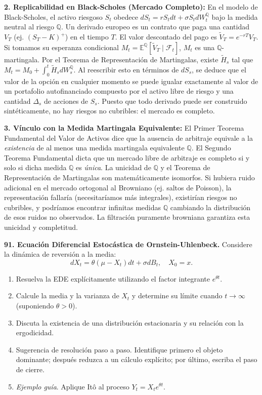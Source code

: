\documentclass[11pt, letterpaper]{article}
\begin{document}
\begin{solucion}
    \textbf{2. Replicabilidad en Black-Scholes (Mercado Completo):}
    En el modelo de Black-Scholes, el activo riesgoso $S_t$ obedece $dS_t = r S_t dt + \sigma S_t dW_t^\mathbb{Q}$ bajo la medida neutral al riesgo $\mathbb{Q}$. 
    Un derivado europeo es un contrato que paga una cantidad $V_T$ (ej. $(S_T - K)^+$) en el tiempo $T$. 
    El valor descontado del pago es $\tilde{V}_T = e^{-rT} V_T$. Si tomamos su esperanza condicional $M_t = \mathbb{E}^\mathbb{Q}[\tilde{V}_T \mid \mathcal{F}_t]$, $M_t$ es una $\mathbb{Q}$-martingala.
    Por el Teorema de Representación de Martingalas, existe $\tilde{H}_s$ tal que $M_t = M_0 + \int_0^t \tilde{H}_s dW_s^\mathbb{Q}$.
    Al reescribir esto en términos de $dS_s$, se deduce que el valor de la opción en cualquier momento se puede igualar exactamente al valor de un portafolio autofinanciado compuesto por el activo libre de riesgo y una cantidad $\Delta_s$ de acciones de $S_s$. Puesto que todo derivado puede ser construido sintéticamente, no hay riesgos no cubribles: el mercado es completo.

    \textbf{3. Vínculo con la Medida Martingala Equivalente:}
    El Primer Teorema Fundamental del Valor de Activos dice que la ausencia de arbitraje equivale a la \textit{existencia} de al menos una medida martingala equivalente $\mathbb{Q}$.
    El Segundo Teorema Fundamental dicta que un mercado libre de arbitraje es completo si y solo si dicha medida $\mathbb{Q}$ es \textit{única}.
    La unicidad de $\mathbb{Q}$ y el Teorema de Representación de Martingalas son matemáticamente isomorfos. Si hubiera ruido adicional en el mercado ortogonal al Browniano (ej. saltos de Poisson), la representación fallaría (necesitaríamos más integrales), existirían riesgos no cubribles, y podríamos encontrar infinitas medidas $\mathbb{Q}$ cambiando la distribución de esos ruidos no observados. La filtración puramente browniana garantiza esta unicidad y completitud.
\end{solucion}

\newpage

\begin{ejercicio}
    \textbf{91. Ecuación Diferencial Estocástica de Ornstein-Uhlenbeck.} Considere la dinámica de reversión a la media:
    \[ dX_t = \theta (\mu - X_t) dt + \sigma dB_t, \quad X_0 = x. \]
    \begin{enumerate}
        \item Resuelva la EDE explícitamente utilizando el factor integrante $e^{\theta t}$.
        \item Calcule la media y la varianza de $X_t$ y determine su límite cuando $t \to \infty$ (suponiendo $\theta > 0$).
        \item Discuta la existencia de una distribución estacionaria y su relación con la ergodicidad.
        \item Sugerencia de resolución paso a paso. Identifique primero el objeto dominante; después reduzca a un cálculo explícito; por último, escriba el paso de cierre.
        \item \textit{Ejemplo guía}. Aplique Itô al proceso $Y_t = X_t e^{\theta t}$.
    \end{enumerate}
\end{ejercicio}
\end{document}
